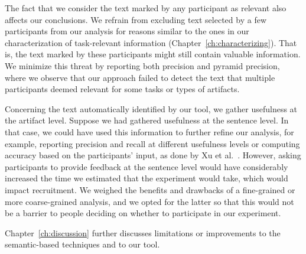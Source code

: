 The fact that we consider the text marked by any participant as relevant 
also affects our conclusions. 
We refrain from excluding text selected by a few participants from our analysis 
for reasons similar to the ones in our characterization of task-relevant information (Chapter~\ref{ch:characterizing}). That is, the text marked by these participants might still contain valuable information. 
We minimize this threat by reporting both precision and pyramid precision, where we observe that 
our approach failed to detect the text that multiple participants deemed relevant
for some tasks or types of artifacts. 



Concerning the text automatically identified by our tool, we gather usefulness at the artifact level.
Suppose we had gathered usefulness at the sentence level. In that case, we could have used this information 
to further refine our analysis, for example, reporting precision and recall 
at different usefulness levels or computing accuracy based on the participants' input, as done by Xu et al.~\cite{Xu2017}. 
However, asking participants to provide feedback at the sentence level would have considerably increased the time we estimated that the experiment would take,
which would impact recruitment. We weighed the benefits and drawbacks of a fine-grained or more coarse-grained 
analysis, and we opted for the latter so that this would not be a barrier to people deciding on 
whether to participate in our experiment.


Chapter~\ref{ch:discussion} further discusses limitations or improvements to the semantic-based techniques and to our tool.